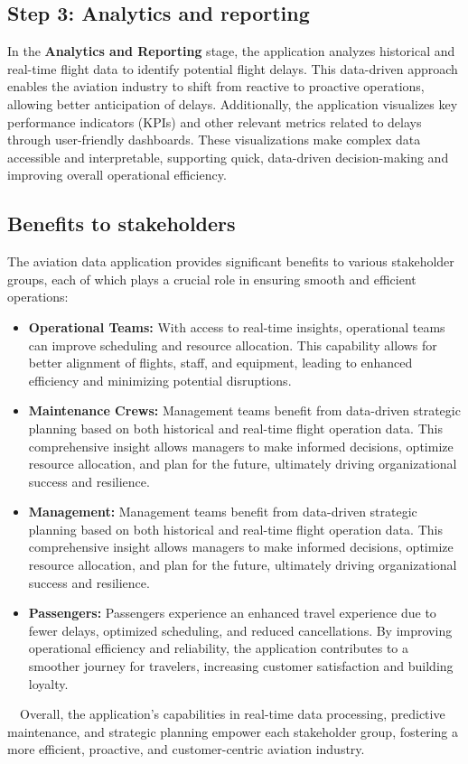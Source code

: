 \documentclass[12pt,a4paper]{article}
\begin{document}
\subsection*{Step 3: Analytics and reporting}
In the \textbf{Analytics and Reporting} stage, the application analyzes historical and real-time flight data to identify potential flight delays. This data-driven approach enables the aviation industry to shift from reactive to proactive operations, allowing better anticipation of delays. Additionally, the application visualizes key performance indicators (KPIs) and other relevant metrics related to delays through user-friendly dashboards. These visualizations make complex data accessible and interpretable, supporting quick, data-driven decision-making and improving overall operational efficiency.

\subsection{Benefits to stakeholders}
The aviation data application provides significant benefits to various
stakeholder groups, each of which plays a crucial role in ensuring smooth and
efficient operations:

\begin{itemize}
    \item \textbf{Operational Teams:} With access to real-time insights,
    operational teams can improve scheduling and resource allocation. This
    capability allows for better alignment of flights, staff, and equipment,
    leading to enhanced efficiency and minimizing potential disruptions.
    \item \textbf{Maintenance Crews:} Management teams benefit from data-driven
    strategic planning based on both historical and real-time flight operation
    data. This comprehensive insight allows managers to make informed decisions,
    optimize resource allocation, and plan for the future, ultimately driving
    organizational success and resilience.
    \item \textbf{Management:} Management teams benefit from data-driven
    strategic planning based on both historical and real-time flight operation
    data. This comprehensive insight allows managers to make informed decisions,
    optimize resource allocation, and plan for the future, ultimately driving
    organizational success and resilience.
    \item \textbf{Passengers:} Passengers experience an enhanced travel
    experience due to fewer delays, optimized scheduling, and reduced
    cancellations. By improving operational efficiency and reliability, the
    application contributes to a smoother journey for travelers, increasing
    customer satisfaction and building loyalty.
\end{itemize}
$\quad$Overall, the application’s capabilities in real-time data processing,
predictive maintenance, and strategic planning empower each stakeholder group,
fostering a more efficient, proactive, and customer-centric aviation industry.
\end{document}
